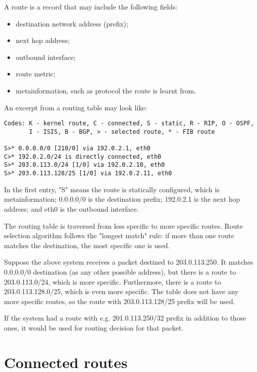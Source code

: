 A route is a record that may include the following fields:
\begin{itemize}
  \item destination network address (prefix);
  \item next hop address;
  \item outbound interface;
  \item route metric;
  \item metainformation, such as protocol the route is learnt from.
\end{itemize}

An excerpt from a routing table may look like:
\begin{verbatim}
Codes: K - kernel route, C - connected, S - static, R - RIP, O - OSPF,
       I - ISIS, B - BGP, > - selected route, * - FIB route

S>* 0.0.0.0/0 [210/0] via 192.0.2.1, eth0
C>* 192.0.2.0/24 is directly connected, eth0
S>* 203.0.113.0/24 [1/0] via 192.0.2.10, eth0
S>* 203.0.113.128/25 [1/0] via 192.0.2.11, eth0
\end{verbatim}

In the first entry, "S" means the route is statically configured, which is metainformation;
0.0.0.0/0 is the destination prefix; 192.0.2.1 is the next hop address; and eth0 is the
outbound interface.

The routing table is traversed from less specific to more specific routes. Route selection
algorithm follows the "longest match" rule: if more than one route matches the destination,
the most specific one is used.

Suppose the above system receives a packet destined to 203.0.113.250. It matches 0.0.0.0/0
destination (as any other possible address), but there is a route to 203.0.113.0/24, which is
more specific. Furthermore, there is a route to 203.0.113.128.0/25, which is even more specific.
The table does not have any more specific routes, so the route with 203.0.113.128/25 prefix 
will be used.

If the system had a route with e.g. 201.0.113.250/32 prefix in addition to those ones, it would
be used for routing decision for that packet.



\section{Connected routes}


